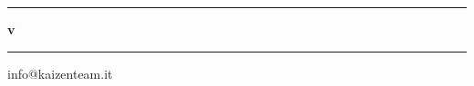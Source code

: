 \begin{titlepage}
\begin{center}
	
	\hrule
	\vspace{3mm}
	\Huge{\textbf{\doctitle{} v\lastversion{}}}
	\vspace{3mm}
	\hrule


	\vspace{2cm}

	\begin{minipage}{0.49\textwidth}
		\raggedright \large info@kaizenteam.it
	\end{minipage}
	\begin{minipage}{0.49\textwidth}
		\raggedleft \large {}
	\end{minipage}

  \end{center}
\end{titlepage}
